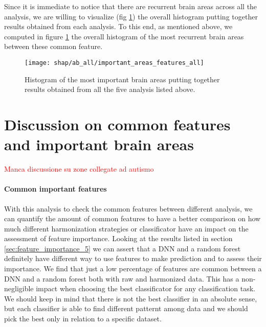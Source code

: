 \documentclass[11pt]{report}
\begin{document}
Since it is immediate to notice that there are recurrent brain areas across all the analysis, we are willing to visualize (fig \ref{fig:important_areas_features_all}) the overall histogram putting together results obtained from each analysis.
To this end, as mentioned above, we computed in figure \ref{fig:important_areas_features_all} the overall histogram of the most recurrent brain areas between these common feature.

\begin{figure}[h]
\centering
  \texttt{[image: shap/ab\_all/important\_areas\_features\_all]}
\caption{Histogram of the most important brain areas putting together results obtained from all the five analysis listed above.}
\label{fig:important_areas_features_all}
\end{figure}

\section{Discussion on common features and important brain areas}
\textcolor{red}{Manca discussione su zone collegate ad autismo}
\paragraph{Common important features}
With this analysis to check the common features between different analysis, we can quantify the amount of common features to have a better comparison on how much different harmonization strategies or classificator have an impact on the assessment of feature importance.
Looking at the results listed in section \ref{sec:feature_importance_5} we can assert that a DNN and a random forest definitely have different way to use features to make prediction and to assess their importance.
We find that just a low percentage of features are common between a DNN and a random forest both with raw and harmonized data.
This has a non-negligible impact when choosing the best classificator for any classification task.
We should keep in mind that there is not the best classifier in an absolute sense, but each classifier is able to find different patternt among data and we should pick the best only in relation to a specific dataset.
\end{document}

